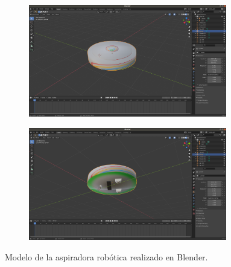  \begin{figure}[H]
  \begin{subfigure}[b]{0.5\textwidth}
  \centering
    \includegraphics[width=0.95\textwidth, height=0.7\textwidth]{chapters/images/roombablender.png}
    \caption{}
    \label{fig:f1}
  \end{subfigure}
  \hfill
  \begin{subfigure}[b]{0.5\textwidth}
  \centering
    \includegraphics[width=0.95\textwidth, height=0.7\textwidth]{chapters/images/roombablender2.png}
	\caption{}    
    \label{fig:f2}
 
  \end{subfigure}
  \caption{Modelo de la aspiradora robótica  realizado en Blender.}
\end{figure}



